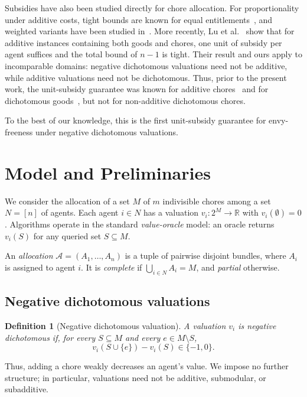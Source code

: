 \documentclass[sigconf,anonymous]{aamas}
\newcommand{\agents}{N}
\newcommand{\items}{M}
\newcommand{\alloc}{\mathcal{A}}
\newcommand{\bundle}[1]{A_{#1}}
\newcommand{\R}{\mathbb{R}}
\theoremstyle{acmplain}
\theoremstyle{acmdefinition}
\newtheorem{definition}[theorem]{Definition}
\theoremstyle{acmplain}
\begin{document}
Subsidies have also been studied directly for chore allocation. For proportionality under additive costs, tight bounds are known for equal entitlements~\cite{wu2025revisiting}, and weighted variants have been studied in~\cite{wu2024tree,GSW25}. More recently, Lu et al.~\cite{LMS26} show that for additive instances containing both goods and chores, one unit of subsidy per agent suffices and the total bound of $n-1$ is tight. Their result and ours apply to incomparable domains: negative dichotomous valuations need not be additive, while additive valuations need not be dichotomous. Thus, prior to the present work, the unit-subsidy guarantee was known for additive chores~\cite{LMS26} and for dichotomous goods~\cite{BKNS22}, but not for non-additive dichotomous chores.

To the best of our knowledge, this is the first unit-subsidy guarantee for envy-freeness under negative dichotomous valuations.

\section{Model and Preliminaries}
\label{sec:prelim}

We consider the allocation of a set $\items$ of $m$ indivisible chores
among a set $\agents=[n]$ of agents. Each agent $i\in\agents$ has a
valuation $v_i:2^{\items}\to\R$ with $v_i(\emptyset)=0$. Algorithms
operate in the standard \emph{value-oracle} model: an oracle returns
$v_i(S)$ for any queried set $S\subseteq\items$.

An \emph{allocation}
$\alloc=(\bundle{1},\ldots,\bundle{n})$ is a tuple of pairwise
disjoint bundles, where $\bundle{i}$ is assigned to agent $i$.
It is \emph{complete} if
$\bigcup_{i\in\agents}\bundle{i}=\items$, and \emph{partial}
otherwise.

\subsection{Negative dichotomous valuations}

\begin{definition}[Negative dichotomous valuation]
\label{def:negdich}
A valuation $v_i$ is \emph{negative dichotomous} if, for every
$S\subseteq\items$ and every $e\in\items\setminus S$,
\[
v_i(S\cup\{e\})-v_i(S)\in\{-1,0\}.
\]
\end{definition}

Thus, adding a chore weakly decreases an agent's value. We impose
no further structure; in particular, valuations need not be
additive, submodular, or subadditive.
\end{document}
